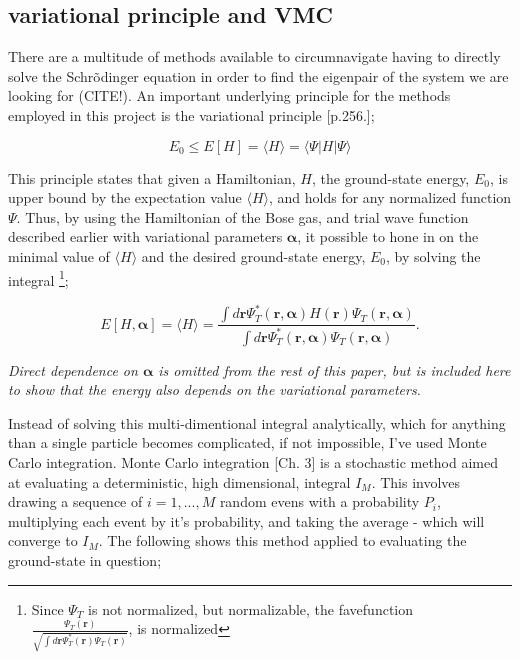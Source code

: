 \documentclass[%
oneside,                 %
final,                   %
10pt]{article}
\begin{document}
\subsection{variational principle and VMC} \label{S:VMC}
There are a multitude of methods available to circumnavigate having to directly solve the Schrõdinger equation in order to find the eigenpair of the system we are looking for (CITE!). An important underlying principle for the methods employed in this project is the variational principle \citep{Griffiths95}[p.256.]; 

\begin{equation}
E_0\leq E[H]= \langle H \rangle = \langle \Psi | H | \Psi \rangle
\end{equation}

This principle states that given a Hamiltonian, $H$, the ground-state energy, $E_0$, is upper bound by the expectation value $\langle H \rangle $, and holds for any normalized function $\Psi$. Thus, by using the Hamiltonian of the Bose gas, and trial wave function described earlier with variational parameters $\bm \alpha$, it possible to hone in on the minimal value of $\langle H \rangle$ and the desired ground-state energy, $E_0$, by solving the integral \footnote{Since $\Psi_T$ is not normalized, but normalizable, the favefunction $\frac{\Psi_T(\bm r)}{\sqrt{\int d\bm r \Psi_T^* (\bm r) \Psi_T(\bm r)}}$, is normalized};

\begin{equation}
E[H,\bm \alpha] = \langle H \rangle = \frac{\int d \bm r \Psi_T^* ( \bm r,\bm \alpha) H(\bm r) \Psi_T ( \bm r, \bm \alpha)}{\int d \bm r \Psi_T^* ( \bm r, \bm \alpha) \Psi_T ( \bm r, \bm \alpha)}.
\end{equation}

\textit{Direct dependence on $\bm \alpha$ is omitted from the rest of this paper, but is included here to show that the energy also depends on the variational parameters.}

Instead of solving this multi-dimentional integral analytically, which for anything than a single particle becomes complicated, if not impossible, I've used Monte Carlo integration. Monte Carlo integration \citep{CMP}[Ch. 3] is a stochastic method aimed at evaluating a deterministic, high dimensional, integral $I_M$. This involves drawing a sequence of $i=1,...,M$ random evens with a probability $P_i$, multiplying each event by it's probability, and taking the average - which will converge to $I_M$. The following shows this method applied to evaluating the ground-state in question;
\end{document}
